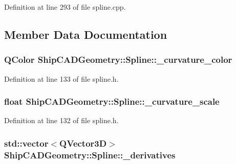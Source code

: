 Definition at line 293 of file spline.\-cpp.



\subsection{Member Data Documentation}
\hypertarget{classShipCADGeometry_1_1Spline_a2c51c87d9f9caedf39f887029f040a36}{
\subsubsection[{\-\_\-curvature\-\_\-color}]{\setlength{\rightskip}{0pt plus 5cm}Q\-Color Ship\-C\-A\-D\-Geometry\-::\-Spline\-::\-\_\-curvature\-\_\-color\hspace{0.3cm}{\ttfamily [protected]}}}\label{classShipCADGeometry_1_1Spline_a2c51c87d9f9caedf39f887029f040a36}


Definition at line 133 of file spline.\-h.

\hypertarget{classShipCADGeometry_1_1Spline_a775e87cfe42d7f2eb747b1ab3e772b88}{
\subsubsection[{\-\_\-curvature\-\_\-scale}]{\setlength{\rightskip}{0pt plus 5cm}float Ship\-C\-A\-D\-Geometry\-::\-Spline\-::\-\_\-curvature\-\_\-scale\hspace{0.3cm}{\ttfamily [protected]}}}\label{classShipCADGeometry_1_1Spline_a775e87cfe42d7f2eb747b1ab3e772b88}


Definition at line 132 of file spline.\-h.

\hypertarget{classShipCADGeometry_1_1Spline_a57c78404d9c30c448d9f5ac377fc0e8f}{
\subsubsection[{\-\_\-derivatives}]{\setlength{\rightskip}{0pt plus 5cm}std\-::vector$<$Q\-Vector3\-D$>$ Ship\-C\-A\-D\-Geometry\-::\-Spline\-::\-\_\-derivatives\hspace{0.3cm}{\ttfamily [protected]}}}\label{classShipCADGeometry_1_1Spline_a57c78404d9c30c448d9f5ac377fc0e8f}



